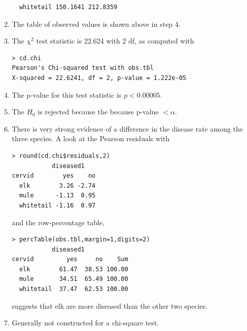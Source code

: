 \documentclass[10pt,openany]{book}\usepackage[]{graphicx}\usepackage[]{color}
\makeatletter
\newenvironment{kframe}{%
 \def\at@end@of@kframe{}%
 \ifinner\ifhmode%
  \def\at@end@of@kframe{\end{minipage}}%
  \begin{minipage}{\columnwidth}%
 \fi\fi%
 \def\FrameCommand##1{\hskip\@totalleftmargin \hskip-\fboxsep
 \colorbox{shadecolor}{##1}\hskip-\fboxsep
     \hskip-\linewidth \hskip-\@totalleftmargin \hskip\columnwidth}%
 \MakeFramed {\advance\hsize-\width
   \@totalleftmargin\z@ \linewidth\hsize
   \@setminipage}}%
 {\par\unskip\endMakeFramed%
 \at@end@of@kframe}
\newenvironment{knitrout}{}{} %
\makeatother
\begin{document}
\begin{itemize}
\begin{enumerate}
\begin{knitrout}
\begin{kframe}
\begin{verbatim}
  whitetail 150.1641 212.8359
\end{verbatim}
\end{kframe}
\end{knitrout}
      \item The table of observed values is shown above in step 4.
      \item The $\chi^{2}$ test statistic is 22.624 with 2 df, as computed with
\begin{knitrout}
\color{fgcolor}\begin{kframe}
\begin{verbatim}
> cd.chi
Pearson's Chi-squared test with obs.tbl 
X-squared = 22.6241, df = 2, p-value = 1.222e-05
\end{verbatim}
\end{kframe}
\end{knitrout}
      \item The p-value for this test statistic is $p<0.00005$.
      \item The $H_{0}$ is rejected because the because p-value $<\alpha$.
      \item There is very strong evidence of a difference in the disease rate among the three species.  A look at the Pearson residuals with
\begin{knitrout}
\color{fgcolor}\begin{kframe}
\begin{verbatim}
> round(cd.chi$residuals,2)
           diseased1
cervid        yes    no
  elk        3.26 -2.74
  mule      -1.13  0.95
  whitetail -1.16  0.97
\end{verbatim}
\end{kframe}
\end{knitrout}
and the row-percentage table,
\begin{knitrout}
\color{fgcolor}\begin{kframe}
\begin{verbatim}
> percTable(obs.tbl,margin=1,digits=2)
           diseased1
cervid         yes     no    Sum
  elk        61.47  38.53 100.00
  mule       34.51  65.49 100.00
  whitetail  37.47  62.53 100.00
\end{verbatim}
\end{kframe}
\end{knitrout}
suggests that elk are more diseased than the other two species.
      \item Generally not constructed for a chi-square test.

\end{enumerate}
\end{itemize}
\end{document}
